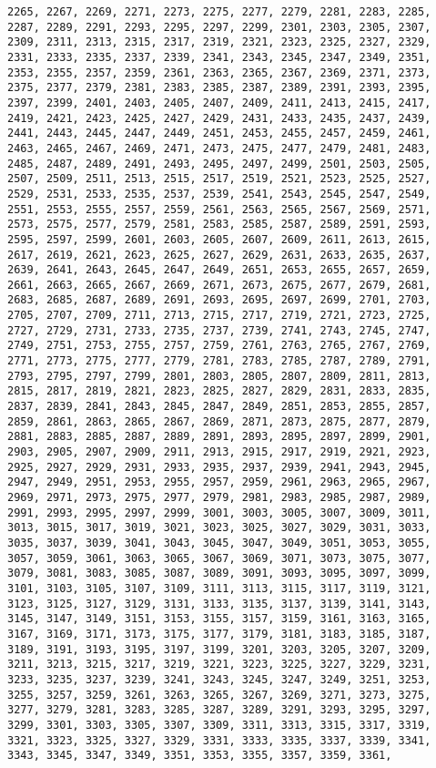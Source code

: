 \documentclass[11pt]{article}
\begin{document}
\begin{Verbatim}[commandchars=\\\{\}]
2265, 2267, 2269, 2271, 2273, 2275, 2277, 2279, 2281, 2283, 2285, 2287, 2289, 2291, 2293, 2295, 2297, 2299, 2301, 2303, 2305, 2307, 2309, 2311, 2313, 2315, 2317, 2319, 2321, 2323, 2325, 2327, 2329, 2331, 2333, 2335, 2337, 2339, 2341, 2343, 2345, 2347, 2349, 2351, 2353, 2355, 2357, 2359, 2361, 2363, 2365, 2367, 2369, 2371, 2373, 2375, 2377, 2379, 2381, 2383, 2385, 2387, 2389, 2391, 2393, 2395, 2397, 2399, 2401, 2403, 2405, 2407, 2409, 2411, 2413, 2415, 2417, 2419, 2421, 2423, 2425, 2427, 2429, 2431, 2433, 2435, 2437, 2439, 2441, 2443, 2445, 2447, 2449, 2451, 2453, 2455, 2457, 2459, 2461, 2463, 2465, 2467, 2469, 2471, 2473, 2475, 2477, 2479, 2481, 2483, 2485, 2487, 2489, 2491, 2493, 2495, 2497, 2499, 2501, 2503, 2505, 2507, 2509, 2511, 2513, 2515, 2517, 2519, 2521, 2523, 2525, 2527, 2529, 2531, 2533, 2535, 2537, 2539, 2541, 2543, 2545, 2547, 2549, 2551, 2553, 2555, 2557, 2559, 2561, 2563, 2565, 2567, 2569, 2571, 2573, 2575, 2577, 2579, 2581, 2583, 2585, 2587, 2589, 2591, 2593, 2595, 2597, 2599, 2601, 2603, 2605, 2607, 2609, 2611, 2613, 2615, 2617, 2619, 2621, 2623, 2625, 2627, 2629, 2631, 2633, 2635, 2637, 2639, 2641, 2643, 2645, 2647, 2649, 2651, 2653, 2655, 2657, 2659, 2661, 2663, 2665, 2667, 2669, 2671, 2673, 2675, 2677, 2679, 2681, 2683, 2685, 2687, 2689, 2691, 2693, 2695, 2697, 2699, 2701, 2703, 2705, 2707, 2709, 2711, 2713, 2715, 2717, 2719, 2721, 2723, 2725, 2727, 2729, 2731, 2733, 2735, 2737, 2739, 2741, 2743, 2745, 2747, 2749, 2751, 2753, 2755, 2757, 2759, 2761, 2763, 2765, 2767, 2769, 2771, 2773, 2775, 2777, 2779, 2781, 2783, 2785, 2787, 2789, 2791, 2793, 2795, 2797, 2799, 2801, 2803, 2805, 2807, 2809, 2811, 2813, 2815, 2817, 2819, 2821, 2823, 2825, 2827, 2829, 2831, 2833, 2835, 2837, 2839, 2841, 2843, 2845, 2847, 2849, 2851, 2853, 2855, 2857, 2859, 2861, 2863, 2865, 2867, 2869, 2871, 2873, 2875, 2877, 2879, 2881, 2883, 2885, 2887, 2889, 2891, 2893, 2895, 2897, 2899, 2901, 2903, 2905, 2907, 2909, 2911, 2913, 2915, 2917, 2919, 2921, 2923, 2925, 2927, 2929, 2931, 2933, 2935, 2937, 2939, 2941, 2943, 2945, 2947, 2949, 2951, 2953, 2955, 2957, 2959, 2961, 2963, 2965, 2967, 2969, 2971, 2973, 2975, 2977, 2979, 2981, 2983, 2985, 2987, 2989, 2991, 2993, 2995, 2997, 2999, 3001, 3003, 3005, 3007, 3009, 3011, 3013, 3015, 3017, 3019, 3021, 3023, 3025, 3027, 3029, 3031, 3033, 3035, 3037, 3039, 3041, 3043, 3045, 3047, 3049, 3051, 3053, 3055, 3057, 3059, 3061, 3063, 3065, 3067, 3069, 3071, 3073, 3075, 3077, 3079, 3081, 3083, 3085, 3087, 3089, 3091, 3093, 3095, 3097, 3099, 3101, 3103, 3105, 3107, 3109, 3111, 3113, 3115, 3117, 3119, 3121, 3123, 3125, 3127, 3129, 3131, 3133, 3135, 3137, 3139, 3141, 3143, 3145, 3147, 3149, 3151, 3153, 3155, 3157, 3159, 3161, 3163, 3165, 3167, 3169, 3171, 3173, 3175, 3177, 3179, 3181, 3183, 3185, 3187, 3189, 3191, 3193, 3195, 3197, 3199, 3201, 3203, 3205, 3207, 3209, 3211, 3213, 3215, 3217, 3219, 3221, 3223, 3225, 3227, 3229, 3231, 3233, 3235, 3237, 3239, 3241, 3243, 3245, 3247, 3249, 3251, 3253, 3255, 3257, 3259, 3261, 3263, 3265, 3267, 3269, 3271, 3273, 3275, 3277, 3279, 3281, 3283, 3285, 3287, 3289, 3291, 3293, 3295, 3297, 3299, 3301, 3303, 3305, 3307, 3309, 3311, 3313, 3315, 3317, 3319, 3321, 3323, 3325, 3327, 3329, 3331, 3333, 3335, 3337, 3339, 3341, 3343, 3345, 3347, 3349, 3351, 3353, 3355, 3357, 3359, 3361, 
\end{Verbatim}
\end{document}
